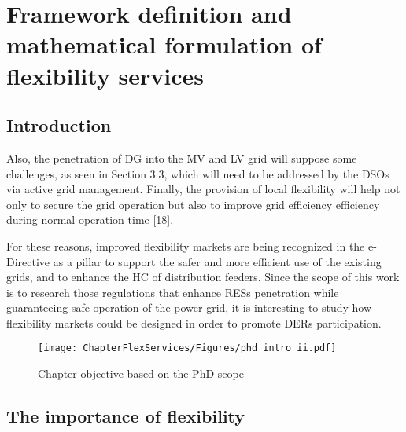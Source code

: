 \chapter{Framework definition and mathematical formulation of flexibility services}
\label{chapterFlexibility}

\section{Introduction}

Also, the penetration of DG into the MV and
LV grid will suppose some challenges, as seen in Section 3.3, which will need to be addressed
by the DSOs via active grid management. Finally, the provision of local flexibility will help not
only to secure the grid operation but also to improve grid efficiency efficiency during normal
operation time [18].

For these reasons, improved flexibility markets are being recognized in the e-Directive as a
pillar to support the safer and more efficient use of the existing grids, and to enhance the HC of
distribution feeders. Since the scope of this work is to research those regulations that enhance
RESs penetration while guaranteeing safe operation of the power grid, it is interesting to study
how flexibility markets could be designed in order to promote DERs participation.

\begin{figure}[]
	\centering
	\texttt{[image: ChapterFlexServices/Figures/phd\_intro\_ii.pdf]}
		\caption{Chapter objective based on the PhD scope}
	\label{fig:chapter_obj_ii}  
\end{figure}

\section{The importance of flexibility}

